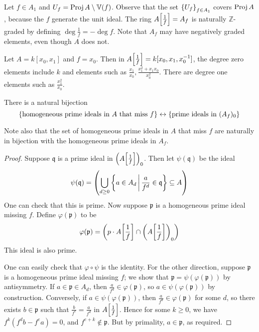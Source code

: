 Let \( f \in A_1 \) and \( U_f = \operatorname{Proj} A \setminus \mathbb V(f) \).
Observe that the set \( \qty{U_f}_{f \in A_1} \) covers \( \operatorname{Proj} A \), because the \( f \) generate the unit ideal.
The ring \( A\qty[\frac{1}{f}] = A_f \) is naturally \( \mathbb Z \)-graded by defining \( \deg \frac{1}{f} = -\deg f \).
Note that \( A_f \) may have negatively graded elements, even though \( A \) does not.
\begin{example}
    Let \( A = k[x_0, x_1] \) and \( f = x_0 \).
    Then in \( A\qty[\frac{1}{f}] = k[x_0, x_1, x_0^{-1}] \), the degree zero elements include \( k \) and elements such as \( \frac{x_1}{x_0}, \frac{x_1^2 + x_1 x_0}{x_0^2} \).
    There are degree one elements such as \( \frac{x_1^2}{x_0} \).
\end{example}
\begin{proposition}
    There is a natural bijection
    \[ \qty{\text{homogeneous prime ideals in \( A \) that miss \( f \)}} \leftrightarrow \qty{\text{prime ideals in } (A_f)_0} \]
\end{proposition}
Note also that the set of homogeneous prime ideals in \( A \) that miss \( f \) are naturally in bijection with the homogeneous prime ideals in \( A_f \).
\begin{proof}
    Suppose \( \mathfrak q \) is a prime ideal in \( \qty(A\qty[\frac{1}{f}])_0 \).
    Then let \( \psi(\mathfrak q) \) be the ideal
    \[ \psi(\mathfrak q) = \qty( \bigcup_{d \geq 0} \qty{a \in A_d \,\middle|\,\frac{a}{f^d} \in \mathfrak q} \subseteq A ) \]
    One can check that this is prime.
    Now suppose \( \mathfrak p \) is a homogeneous prime ideal missing \( f \).
    Define \( \varphi(\mathfrak p) \) to be
    \[ \varphi(\mathfrak p) = \qty(p \cdot A\qty[\frac{1}{f}] \cap \qty(A\qty[\frac{1}{f}])_0) \]
    This ideal is also prime.

    One can easily check that \( \varphi \circ \psi \) is the identity.
    For the other direction, suppose \( \mathfrak p \) is a homogeneous prime ideal missing \( f \); we show that \( \mathfrak p = \psi(\varphi(\mathfrak p)) \) by antisymmetry.
    If \( a \in \mathfrak p \in A_d \), then \( \frac{a}{f^d} \in \varphi(\mathfrak p) \), so \( a \in \psi(\varphi(\mathfrak p)) \) by construction.
    Conversely, if \( a \in \psi(\varphi(\mathfrak p)) \), then \( \frac{a}{f^d} \in \varphi(\mathfrak p) \) for some \( d \), so there exists \( b \in \mathfrak p \) such that \( \frac{b}{f^e} = \frac{a}{f^d} \) in \( A\qty[\frac{1}{f}] \).
    Hence for some \( k \geq 0 \), we have \( f^k (f^d b - f^e a) = 0 \), and \( f^{e+k} \notin \mathfrak p \).
    But by primality, \( a \in \mathfrak p \), as required.
\end{proof}
